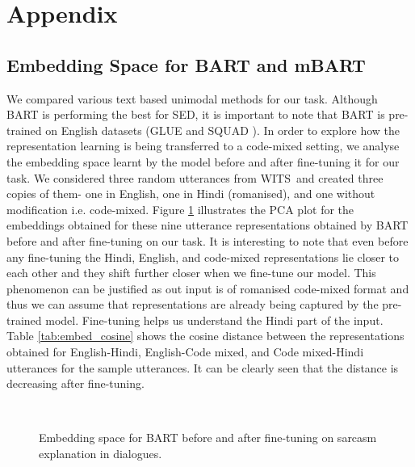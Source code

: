 \documentclass[11pt]{article}
\newcommand{\dataset}{\textsc{WITS}}
\begin{document}



\newpage
\clearpage
\appendix
\section{Appendix}
\subsection{Embedding Space for BART and mBART}
\label{sec:bart_vs_mbart}
We compared various text based unimodal methods for our task. Although BART is performing the best for SED, it is important to note that BART is pre-trained on English datasets (GLUE \citep{wang2018glue} and SQUAD \citep{rajpurkar2016squad}). In order to explore how the representation learning is being transferred to a code-mixed setting, we analyse the embedding space learnt by the model before and after fine-tuning it for our task. We considered three random utterances from \dataset\ and created three copies of them- one in English, one in Hindi (romanised), and one without modification i.e. code-mixed. Figure \ref{fig:embed_space} illustrates the PCA plot for the embeddings obtained for these nine utterance representations obtained by BART before and after fine-tuning on our task. It is interesting to note that even before any fine-tuning the Hindi, English, and code-mixed representations lie closer to each other and they shift further closer when we fine-tune our model. This phenomenon can be justified as out input is of romanised code-mixed format and thus we can assume that representations are already being captured by the pre-trained model. Fine-tuning helps us understand the Hindi part of the input. Table \ref{tab:embed_cosine} shows the cosine distance between the representations obtained for English-Hindi, English-Code mixed, and Code mixed-Hindi utterances for the sample utterances. It can be clearly seen that the distance is decreasing after fine-tuning.

\begin{figure}[ht]
\\
\caption{Embedding space for BART before and after fine-tuning on sarcasm explanation in dialogues.}
\label{fig:embed_space}
\end{figure}
\end{document}
